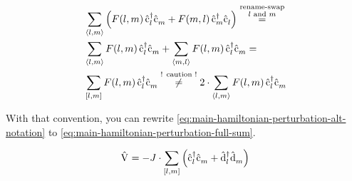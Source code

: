 \begin{equation}
    \label{eq:fullneigborsum}
    \begin{split}
        &\neighborsum[]{l}{m} \left( F(l,m)\, \cop[]{l}{\dagger}\cop[]{m}{} + F(m,l)\, \cop[]{m}{\dagger}\cop[]{l}{} \right) \stackrel{\stackrel{\text{\scriptsize rename-swap}}{\text{$l$ and $m$}}}{=} \\
        &\neighborsum[]{l}{m} F(l,m)\, \cop[]{l}{\dagger}\cop[]{m}{} + \neighborsum[]{m}{l} F(l,m)\, \cop[]{l}{\dagger}\cop[]{m}{} = \\
        &\fullneighborsum[]{l}{m} F(l,m)\, \cop[]{l}{\dagger}\cop[]{m}{} \stackrel{\text{! caution !}}{\neq}
        2 \cdot \neighborsum[]{l}{m} F(l,m)\, \cop[]{l}{\dagger}\cop[]{m}{}
    \end{split}
\end{equation}

With that convention, you can rewrite \autoref{eq:main-hamiltonian-perturbation-alt-notation} to \autoref{eq:main-hamiltonian-perturbation-full-sum}.

\begin{equation}
    \label{eq:main-hamiltonian-perturbation-full-sum}
    \begin{split}
        \Vhamiltonian =  - J \cdot \fullneighborsum{l}{m} \left(\cop[]{l}{\dagger}\cop[]{m}{} + \dop[]{l}{\dagger}\dop[]{m}{} \right)
    \end{split}
\end{equation}
